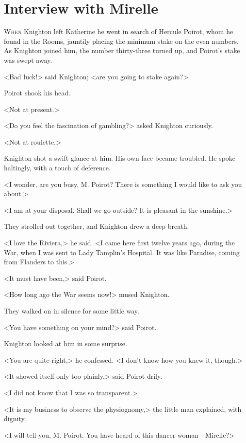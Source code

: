 \chapter{Interview with Mirelle}



\lettrine{W}{hen} Knighton left Katherine he went in search of Hercule Poirot, whom he found in the Rooms, jauntily placing the minimum stake on the even numbers. As Knighton joined him, the number thirty-three turned up, and Poirot's stake was swept away.

<Bad luck!> said Knighton; <are you going to stake again?>

Poirot shook his head.

<Not at present.>

<Do you feel the fascination of gambling?> asked Knighton curiously.

<Not at roulette.>

Knighton shot a swift glance at him. His own face became troubled. He spoke haltingly, with a touch of deference.

<I wonder, are you busy, M. Poirot? There is something I would like to ask you about.>

<I am at your disposal. Shall we go outside? It is pleasant in the sunshine.>

They strolled out together, and Knighton drew a deep breath.

<I love the Riviera,> he said. <I came here first twelve years ago, during the War, when I was sent to Lady Tamplin's Hospital. It was like Paradise, coming from Flanders to this.>

<It must have been,> said Poirot.

<How long ago the War seems now!> mused Knighton.

They walked on in silence for some little way.

<You have something on your mind?> said Poirot.

Knighton looked at him in some surprise.

<You are quite right,> he confessed. <I don't know how you knew it, though.>

<It showed itself only too plainly,> said Poirot drily.

<I did not know that I was so transparent.>

<It is my business to observe the physiognomy,> the little man explained, with dignity.

<I will tell you, M. Poirot. You have heard of this dancer woman—Mirelle?>


